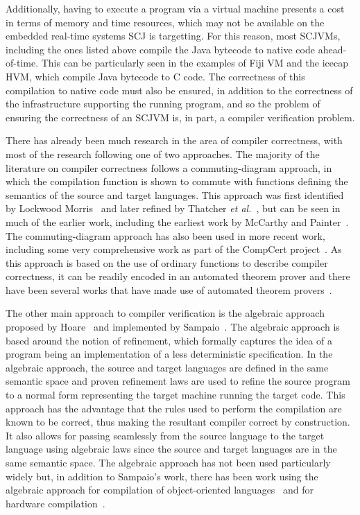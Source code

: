 \documentclass[a4paper,10pt]{report}
\begin{document}
Additionally, having to execute a program via a virtual machine
presents a cost in terms of memory and time resources, which may not
be available on the embedded real-time systems SCJ is targetting.
For this reason, most SCJVMs, including the ones listed above compile
the Java bytecode to native code ahead-of-time.
This can be particularly seen in the examples of Fiji VM and the
icecap HVM, which compile Java bytecode to C code.
The correctness of this compilation to native code must also be
ensured, in addition to the correctness of the infrastructure
supporting the running program, and so the problem of ensuring the
correctness of an SCJVM is, in part, a compiler verification problem.

There has already been much research in the area of compiler
correctness, with most of the research following one of two
approaches.
The majority of the literature on compiler correctness follows a
commuting-diagram approach, in which the compilation function is shown
to commute with functions defining the semantics of the source and
target languages.
This approach was first identified by Lockwood
Morris~\cite{morris1973} and later refined by Thatcher \emph{et
  al.}~\cite{thatcher1979}, but can be seen in much of the earlier
work, including the earliest work by McCarthy and
Painter~\cite{mccarthy1967}.
The commuting-diagram approach has also been used in more recent work,
including some very comprehensive work as part of the CompCert
project~\cite{leroy2009a, leroy2009b}.
As this approach is based on the use of ordinary functions to describe
compiler correctness, it can be readily encoded in an automated
theorem prover and there have been several works that have made use of
automated theorem provers~\cite{klein2006, milner1972, nipkow2000}.

The other main approach to compiler verification is the algebraic
approach proposed by Hoare~\cite{hoare1991} and implemented by
Sampaio~\cite{hoare1993, sampaio1993}.
The algebraic approach is based around the notion of refinement, which
formally captures the idea of a program being an implementation of a
less deterministic specification.
In the algebraic approach, the source and target languages are defined
in the same semantic space and proven refinement laws are used to
refine the source program to a normal form representing the target
machine running the target code.
This approach has the advantage that the rules used to perform the
compilation are known to be correct, thus making the resultant
compiler correct by construction.
It also allows for passing seamlessly from the source language to the
target language using algebraic laws since the source and target
languages are in the same semantic space.
The algebraic approach has not been used particularly widely but, in
addition to Sampaio's work, there has been work using the algebraic
approach for compilation of object-oriented languages~\cite{duran2005,
  duran2010} and for hardware compilation~\cite{perna2010, perna2011}.
\end{document}
